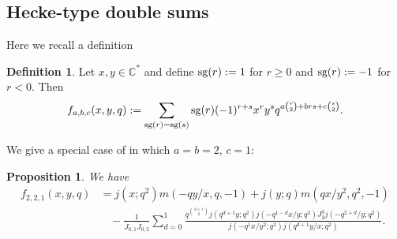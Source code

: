 \documentclass[12pt,reqno]{amsart}
\newtheorem{proposition}[theorem]{Proposition}
\theoremstyle{remark}
\theoremstyle{definition}
\newtheorem{definition}[theorem]{Definition}
\numberwithin{theorem}{section} \numberwithin{equation}{section}
\numberwithin{example}{section}
\begin{document}
\subsection{Hecke-type double sums}  Here we recall a definition \cite{HM}
\begin{definition} \label{definition:fabc-def}  Let $x,y\in\mathbb{C}^*$ and define ${\textnormal{sg}} (r):=1$ for $r\ge 0$ and ${\textnormal{sg}}(r):=-1$ for $r<0$. Then
\begin{equation}
f_{a,b,c}(x,y,q):=\sum_{\substack{{\textnormal{sg}} (r)={\textnormal{sg}}(s)}} {\textnormal{sg}}(r)(-1)^{r+s}x^ry^sq^{a\binom{r}{2}+brs+c\binom{s}{2}}.\label{equation:fabc-def}\\
\end{equation}
\end{definition}
We give a special case of \cite[Theorem $0.4$ ]{HM} in which $a=b=2$, $c=1$:
\begin{proposition}\label{proposition:f221}We have
\begin{align*}
f_{2,2,1}(x,y,q)&=j(x;q^2)m(-qy/x,q,-1)+j(y;q)m(qx/y^2,q^2,-1)\\
&\ \ \ \ -\frac{1}{\overline{J}_{0,1}\overline{J}_{0,2}}\sum_{d=0}^1\frac{q^{\binom{d+1}{2}}j(q^{d+1}y;q^2)j(-q^{1-d}x/y;q^2)J_2^3j(-q^{2+d}/y;q^2)}{j(-q^{1}x/y^2;q^2)j(q^{d+1}y/x;q^2)}.
\end{align*}
\end{proposition}
\end{document}
